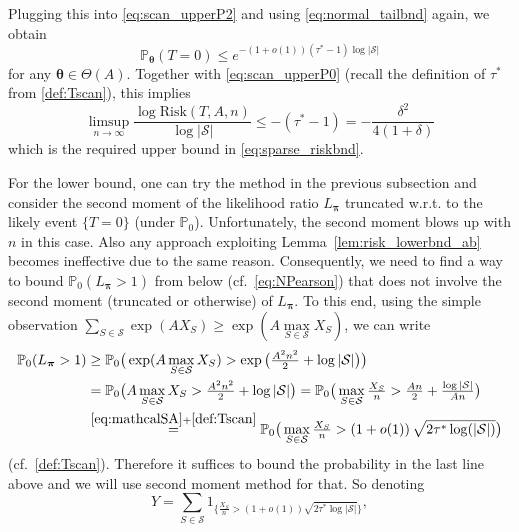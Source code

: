 \documentclass[11pt,reqno,letterpaper]{amsart}
\numberwithin{equation}{section}
\theoremstyle{plain}
\def \btheta{\boldsymbol{\theta}}
\def \bpi{\boldsymbol{\pi}}
\def \P{\mathbb{P}}
\begin{document}
Plugging this into \eqref{eq:scan_upperP2} and using \eqref{eq:normal_tailbnd} 
again, we obtain
\begin{equation*}
\P_{\btheta}(T = 0) \le e^{-(1 + o(1))(\tau^\ast - 1)\log |\mathcal S|}
\end{equation*}
for any $\btheta \in \Theta(A)$. Together with \eqref{eq:scan_upperP0} (recall the 
definition of $\tau^\ast$ from \eqref{def:Tscan}), this implies
\begin{equation*}%
\limsup_{n\rightarrow \infty}\frac{\log{\mathrm{Risk}(T,A,n)}}{\log{|\mathcal{S}|}} \le  -(\tau^*-1) = -\frac{\delta^2}{4(1+\delta)}
\end{equation*}
which is the required upper bound in \eqref{eq:sparse_riskbnd}.

\smallskip


 For the lower bound, one can try the method in the previous subsection and consider 
the second moment of the likelihood ratio $L_{\bpi}$ truncated w.r.t. to 
the likely event $\{T = 0\}$ (under $\P_0$). Unfortunately, the second moment 
blows up with $n$ in this case. Also any approach exploiting 
Lemma~\ref{lem:risk_lowerbnd_ab} becomes ineffective due to the same reason. 
Consequently, we need to find a way to bound $\P_0(L_{\bpi} > 1)$ from below 
(cf.~\eqref{eq:NPearson}) that does not involve the second moment (truncated or 
otherwise) of $L_{\bpi}$. To this end, using the simple observation $\sum_{S \in \mathcal S} \exp(A X_S) \ge \exp(A\max\limits_{S \in \mathcal S}X_S)$, we can write
\begin{equation}\label{eq:LR_sparse}
\begin{split}
\P_0(L_{\bpi}>1) &\ge \P_0\big(\exp(A \max_{S\in \mathcal{S}} X_S)>\exp\big(\tfrac{A^2n^2}2+\log{|\mathcal{S}|}\big)\big) \\
&= \P_0\big(A\max\limits_{S\in \mathcal{S}}X_S > \tfrac{A^2n^2}{2} +\log{|\mathcal{S}|}\big) = \P_0\big(\max\limits_{S\in \mathcal{S}} \tfrac{X_S}{n} > \tfrac{An}{2} + \tfrac{\log{|\mathcal{S}|}}{An}\big)\\ &\stackrel{\eqref{eq:mathcalSA} + \eqref{def:Tscan}}{=} \P_0\big(\max\limits_{S\in \mathcal{S}} \tfrac{X_S}{n} > (1 + o(1)) \, \sqrt{2\tau^*\log(|\mathcal{S}|)} \big)
\end{split}  
\end{equation}
(cf.~\eqref{def:Tscan}). Therefore it suffices to bound the probability in the 
last line above and we will use second moment method for that. So denoting 
\begin{equation*}
Y = \sum_{S \in \mathcal S} 1_{\big\{\tfrac{X_S}{n} > (1 + o(1))\sqrt{2\tau^\ast \log |\mathcal S|}\big\}},
\end{equation*}
\end{document}
